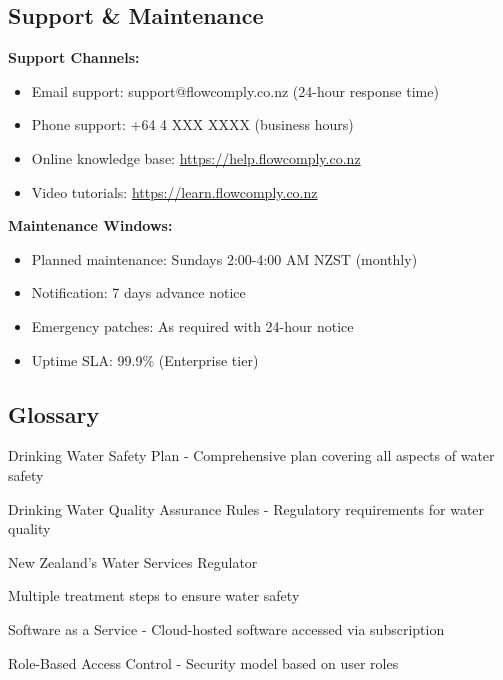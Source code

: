 \documentclass[11pt,a4paper]{article}
\begin{document}
\subsection{Support \& Maintenance}

\textbf{Support Channels:}
\begin{itemize}[itemsep=0.2em]
    \item Email support: support@flowcomply.co.nz (24-hour response time)
    \item Phone support: +64 4 XXX XXXX (business hours)
    \item Online knowledge base: \url{https://help.flowcomply.co.nz}
    \item Video tutorials: \url{https://learn.flowcomply.co.nz}
\end{itemize}

\textbf{Maintenance Windows:}
\begin{itemize}[itemsep=0.2em]
    \item Planned maintenance: Sundays 2:00-4:00 AM NZST (monthly)
    \item Notification: 7 days advance notice
    \item Emergency patches: As required with 24-hour notice
    \item Uptime SLA: 99.9\% (Enterprise tier)
\end{itemize}

\subsection{Glossary}

\begin{description}[leftmargin=*, itemsep=0.3em]
    \item[DWSP] Drinking Water Safety Plan - Comprehensive plan covering all aspects of water safety
    \item[DWQAR] Drinking Water Quality Assurance Rules - Regulatory requirements for water quality
    \item[Taumata Arowai] New Zealand's Water Services Regulator
    \item[Multi-Barrier Approach] Multiple treatment steps to ensure water safety
    \item[SaaS] Software as a Service - Cloud-hosted software accessed via subscription
    \item[RBAC] Role-Based Access Control - Security model based on user roles
\end{description}

\newpage
\end{document}
